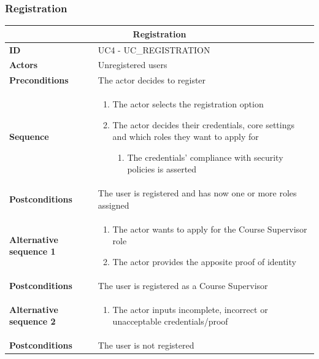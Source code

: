 \subsubsection{Registration}
\begin{tabular}{|m{2.5cm}|m{8cm}|}
	\hline
	\multicolumn{2}{|c|}{Registration} \\
	\hline
	\textbf{ID} & UC4 - UC\_REGISTRATION \\
	\hline
	\textbf{Actors} & Unregistered users \\
	\hline
	\textbf{Preconditions} & The actor decides to register \\
	\hline
	\textbf{Sequence} & 
	\begin{enumerate}
		\item The actor selects the registration option
		\item The actor decides their credentials, core settings and which roles they want to apply for
		\begin{enumerate}
			\item The credentials’ compliance with security policies is asserted
		\end{enumerate}
	\end{enumerate} \\
	\hline
	\textbf{Postconditions} & The user is registered and has now one or more roles assigned \\
	\hline
	
	\textbf{Alternative sequence 1} & 
	\begin{enumerate}
		\item The actor wants to apply for the Course Supervisor role
		\item The actor provides the apposite proof of identity
	\end{enumerate} \\
	\hline
	\textbf{Postconditions} & The user is registered as a Course Supervisor \\
	\hline
	
	\textbf{Alternative sequence 2} & 
	\begin{enumerate}
		\item The actor inputs incomplete, incorrect or unacceptable credentials/proof
	\end{enumerate} \\
	\hline
	\textbf{Postconditions} & The user is not registered \\
	\hline
\end{tabular}

